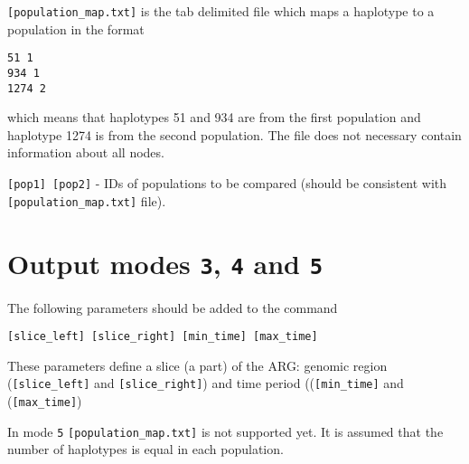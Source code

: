 \documentclass[11pt]{amsart}
\theoremstyle{definition}
\theoremstyle{remark}
\begin{document}
	\texttt{[population\_map.txt]} is the tab delimited file which maps a haplotype to a population in the format
	\begin{displayquote}
		\texttt{51	1\\
		934	1\\
		1274	2}
	\end{displayquote}
	which means that haplotypes 51 and 934 are from the first population and haplotype 1274 is from the second population. The file does not necessary contain information about all nodes.
	
	\texttt{[pop1] [pop2]} - IDs of populations to be compared (should be consistent with \texttt{[population\_map.txt]} file).

\section{Output modes \texttt{3}, \texttt{4}  and \texttt{5} }
	The following parameters should be added to the command
	\begin{displayquote}
		\texttt{[slice\_left] [slice\_right] [min\_time] [max\_time]}
	\end{displayquote}
	These parameters define a slice (a part) of the ARG: genomic region (\texttt{[slice\_left]} and \texttt{[slice\_right]}) and time period ((\texttt{[min\_time]} and (\texttt{[max\_time]})
	
	In mode \texttt{5} \texttt{[population\_map.txt]} is not supported yet. It is assumed that the number of haplotypes is equal in each population.
	
\end{document}
